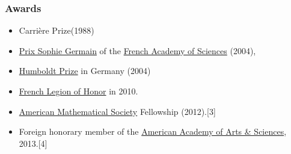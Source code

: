 \documentclass{article}
\begin{document}
\subsubsection{Awards}
\begin{itemize}
	\item Carrière Prize(1988)
	\item \href{https://en.wikipedia.org/wiki/Sophie_Germain#Sophie_Germain_Prize}{Prix Sophie Germain} of the \href{https://en.wikipedia.org/wiki/French_Academy_of_Sciences}{French Academy of Sciences} (2004),
	\item \href{https://en.wikipedia.org/wiki/Humboldt_Prize}{Humboldt Prize} in Germany (2004)
	\item \href{https://en.wikipedia.org/wiki/French_Legion_of_Honor}{French Legion of Honor} in 2010.
	\item \href{https://en.wikipedia.org/wiki/American_Mathematical_Society}{American Mathematical Society} Fellowship (2012).[3]
	\item Foreign honorary member of the \href{https://en.wikipedia.org/wiki/American_Academy_of_Arts_and_Sciences}{American Academy of Arts \& Sciences}, 2013.[4]
\end{itemize}
\end{document}
